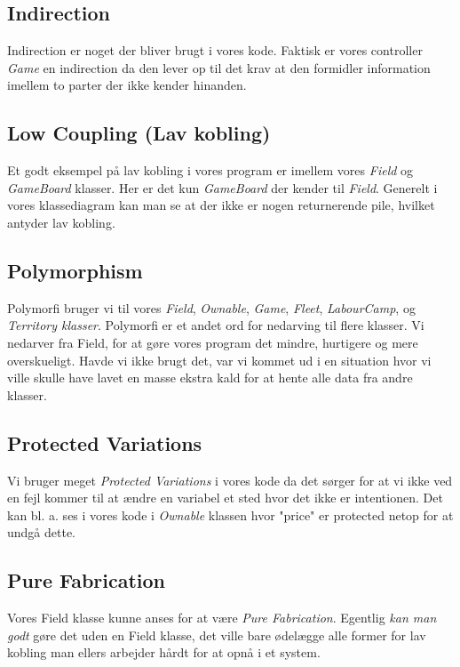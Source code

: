 \subsection{Indirection}
Indirection er noget der bliver brugt i vores kode. Faktisk er vores controller \textit{Game} en indirection da den lever op til det krav at den formidler information imellem to parter der ikke kender hinanden.
\subsection{Low Coupling (Lav kobling)}
Et godt eksempel på lav kobling i vores program er imellem vores \textit{Field} og \textit{GameBoard} klasser. Her er det kun \textit{GameBoard} der kender til \textit{Field}. Generelt i vores klassediagram kan man se at der ikke er nogen returnerende pile, hvilket antyder lav kobling.
\subsection{Polymorphism}
Polymorfi bruger vi til vores \textit{Field}, \textit{Ownable}, \textit{Game}, \textit{Fleet}, \textit{LabourCamp}, og \textit{Territory klasser}. Polymorfi er et andet ord for nedarving til flere klasser. Vi nedarver fra Field, for at gøre vores program det mindre, hurtigere og mere overskueligt. Havde vi ikke brugt det, var vi kommet ud i en situation hvor vi ville skulle have lavet en masse ekstra kald for at hente alle data fra andre klasser.
\subsection{Protected Variations}
Vi bruger meget \textit{Protected Variations} i vores kode da det sørger for at vi ikke ved en fejl kommer til at ændre en variabel et sted hvor det ikke er intentionen. Det kan bl. a. ses i vores kode i \textit{Ownable} klassen hvor "price" er protected netop for at undgå dette. 
\subsection{Pure Fabrication}
Vores Field klasse kunne anses for at være \textit{Pure Fabrication}. Egentlig \textit{kan man godt} gøre det uden en Field klasse, det ville bare ødelægge alle former for lav kobling man ellers arbejder hårdt for at opnå i et system.
\newpage